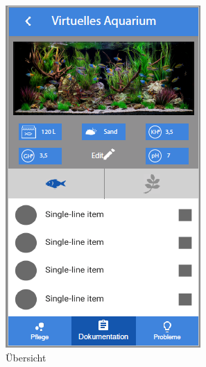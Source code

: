 \begin{figure}
	\begin{subfigure}[b]{0.3\textwidth}
		\includegraphics[width=\textwidth]{virtuellesAquarium}
		\caption{Übersicht}
		\label{doku:aq:a}
	\end{subfigure}	
	\begin{subfigure}[b]{0.3\textwidth}

\end{subfigure}
\end{figure}
